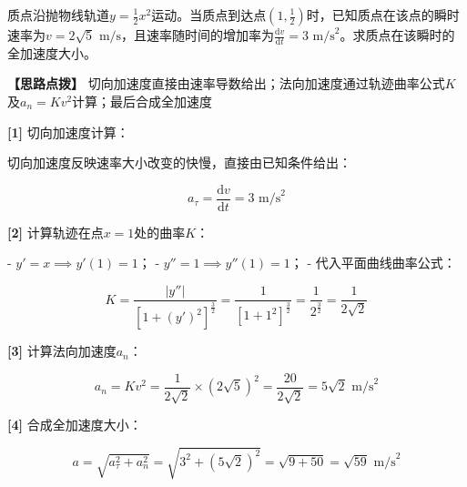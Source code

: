 \documentclass[11pt,a4paper,UTF8]{ctexart}
\begin{document}
质点沿抛物线轨道$y = \frac{1}{2}x^2$运动。当质点到达点$(1, \frac{1}{2})$时，已知质点在该点的瞬时速率为$v = 2\sqrt{5}\text{ m/s}$，且速率随时间的增加率为$\frac{\mathrm{d}v}{\mathrm{d}t} = 3\text{ m/s}^2$。求质点在该瞬时的全加速度大小。

\textbf{\color{DeepPurple}【思路点拨】} 切向加速度直接由速率导数给出；法向加速度通过轨迹曲率公式$K$及$a_n = Kv^2$计算；最后合成全加速度


\begin{solbox}[分步推导与答题规范]
\textbf{[1]} 切向加速度计算：

切向加速度反映速率大小改变的快慢，直接由已知条件给出：


\begin{equation*}
a_\tau = \frac{\mathrm{d}v}{\mathrm{d}t} = 3\text{ m/s}^2
\end{equation*}


\textbf{[2]} 计算轨迹在点$x = 1$处的曲率$K$：

- $y' = x \implies y'(1) = 1$；
- $y'' = 1 \implies y''(1) = 1$；
- 代入平面曲线曲率公式：

 
\begin{equation*}
K = \frac{\vert{}y''\vert{}}{[1 + (y')^2]^{\frac{3}{2}}} = \frac{1}{[1 + 1^2]^{\frac{3}{2}}} = \frac{1}{2^{\frac{3}{2}}} = \frac{1}{2\sqrt{2}}
\end{equation*}


\textbf{[3]} 计算法向加速度$a_n$：


\begin{equation*}
a_n = K v^2 = \frac{1}{2\sqrt{2}} \times (2\sqrt{5})^2 = \frac{20}{2\sqrt{2}} = 5\sqrt{2}\text{ m/s}^2
\end{equation*}


\textbf{[4]} 合成全加速度大小：


\begin{equation*}
a = \sqrt{a_\tau^2 + a_n^2} = \sqrt{3^2 + (5\sqrt{2})^2} = \sqrt{9 + 50} = \sqrt{59}\text{ m/s}^2
\end{equation*}

\end{solbox}
\end{document}
